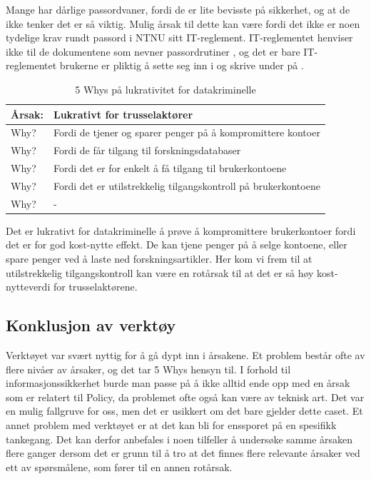 Mange har dårlige passordvaner, fordi de er lite bevisste på sikkerhet, og at de ikke tenker det er så viktig. Mulig årsak til dette kan være fordi det ikke er noen tydelige krav rundt passord i NTNU sitt IT-reglement. IT-reglementet henviser ikke til de dokumentene som nevner passordrutiner \cite{ITReg}, og det er bare IT-reglementet brukerne er pliktig å sette seg inn i og skrive under på \cite{}. 

\begin{table} [H]
    \centering
    \begin{tabular}{ | m{5em} | m{30em} | }
        \hline
            \cellcolor{yellow} Årsak: & \cellcolor{yellow} Lukrativt for trusselaktører \\
        \hline
            Why? & Fordi de tjener og sparer penger på å kompromittere kontoer \\
        \hline
            Why? & Fordi de får tilgang til forskningsdatabaser \\
        \hline
            Why? & Fordi det er for enkelt å få tilgang til brukerkontoene \\
        \hline
            Why? & Fordi det er utilstrekkelig tilgangskontroll på brukerkontoene \\
        \hline
            Why? & - \\
        \hline
    \end{tabular}
    \caption[5 Whys: Lukrativt for datakriminelle]{5 Whys på lukrativitet for datakriminelle}
    \label{5Whys-passordvaner}
\end{table}

Det er lukrativt for datakriminelle å prøve å kompromittere brukerkontoer fordi det er for god kost-nytte effekt. De kan tjene penger på å selge kontoene, eller spare penger ved å laste ned forskningsartikler. Her kom vi frem til at utilstrekkelig tilgangskontroll kan være en rotårsak til at det er så høy kost-nytteverdi for trusselaktørene.

\subsection{Konklusjon av verktøy}
Verktøyet var svært nyttig for å gå dypt inn i årsakene. Et problem består ofte av flere nivåer av årsaker, og det tar 5 Whys hensyn til. I forhold til informasjonssikkerhet burde man passe på å ikke alltid ende opp med en årsak som er relatert til Policy, da problemet ofte også kan være av teknisk art. Det var en mulig fallgruve for oss, men det er usikkert om det bare gjelder dette caset. Et annet problem med verktøyet er at det kan bli for enssporet på en spesifikk tankegang. Det kan derfor anbefales i noen tilfeller å undersøke samme årsaken flere ganger dersom det er grunn til å tro at det finnes flere relevante årsaker ved ett av spørsmålene, som fører til en annen rotårsak. 
